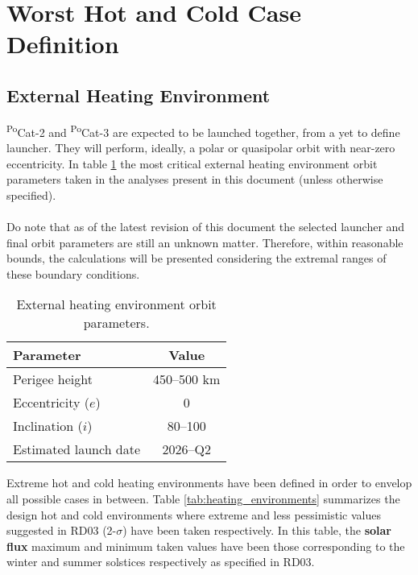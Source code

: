 \section{Worst Hot and Cold Case Definition}

\subsection{External Heating Environment}
\textsuperscript{Po}Cat-2 and \textsuperscript{Po}Cat-3 are expected
to be launched together, from a yet to define launcher. They will perform,
ideally, a polar or quasipolar orbit with near-zero eccentricity. 
In table \ref{tab::orbit_params} the most critical external heating 
environment orbit parameters taken in the analyses present in this document
 (unless otherwise specified).

 \paragraph{}
 Do note that as of the latest revision of this document the selected launcher and
 final orbit parameters are still an unknown matter. Therefore, within reasonable bounds,
 the calculations will be presented considering the extremal ranges of these boundary
 conditions. 

 \begin{table}[H]
    \centering
    \begin{tabular}{lc}
        \toprule
        \textbf{Parameter} & \textbf{Value} \\
        \midrule
        Perigee height             & 450--500 km     \\
        Eccentricity ($e$)         & 0       \\
        Inclination ($i$)          & 80--100       \\
        Estimated launch date      & 2026--Q2        \\
        \bottomrule
    \end{tabular}
    \caption{External heating environment orbit parameters.}
    \label{tab::orbit_params}
\end{table}

Extreme hot and cold heating environments have been defined in order to envelop all possible cases in between.
Table \ref{tab:heating_environments} summarizes the design hot and cold environments where extreme and less pessimistic values suggested 
in RD03 (2-$\sigma$) have been taken respectively. In this table, the \textbf{solar flux} maximum 
and minimum taken values have been those corresponding to the winter and summer solstices respectively as specified in RD03.

